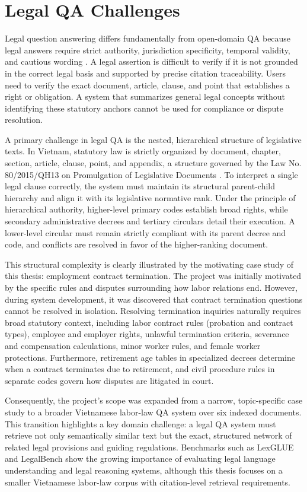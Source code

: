 \section{Legal QA Challenges}
Legal question answering differs fundamentally from open-domain QA because legal answers require strict authority, jurisdiction specificity, temporal validity, and cautious wording \cite{zhong2020legalqa}. A legal assertion is difficult to verify if it is not grounded in the correct legal basis and supported by precise citation traceability. Users need to verify the exact document, article, clause, and point that establishes a right or obligation. A system that summarizes general legal concepts without identifying these statutory anchors cannot be used for compliance or dispute resolution.

A primary challenge in legal QA is the nested, hierarchical structure of legislative texts. In Vietnam, statutory law is strictly organized by document, chapter, section, article, clause, point, and appendix, a structure governed by the Law No. 80/2015/QH13 on Promulgation of Legislative Documents \cite{vietnam2015law80}. To interpret a single legal clause correctly, the system must maintain its structural parent-child hierarchy and align it with its legislative normative rank. Under the principle of hierarchical authority, higher-level primary codes establish broad rights, while secondary administrative decrees and tertiary circulars detail their execution. A lower-level circular must remain strictly compliant with its parent decree and code, and conflicts are resolved in favor of the higher-ranking document.

This structural complexity is clearly illustrated by the motivating case study of this thesis: employment contract termination. The project was initially motivated by the specific rules and disputes surrounding how labor relations end. However, during system development, it was discovered that contract termination questions cannot be resolved in isolation. Resolving termination inquiries naturally requires broad statutory context, including labor contract rules (probation and contract types), employee and employer rights, unlawful termination criteria, severance and compensation calculations, minor worker rules, and female worker protections. Furthermore, retirement age tables in specialized decrees determine when a contract terminates due to retirement, and civil procedure rules in separate codes govern how disputes are litigated in court.

Consequently, the project's scope was expanded from a narrow, topic-specific case study to a broader Vietnamese labor-law QA system over six indexed documents. This transition highlights a key domain challenge: a legal QA system must retrieve not only semantically similar text but the exact, structured network of related legal provisions and guiding regulations. Benchmarks such as LexGLUE \cite{chalkidis2021lexglue} and LegalBench \cite{guha2023legalbench} show the growing importance of evaluating legal language understanding and legal reasoning systems, although this thesis focuses on a smaller Vietnamese labor-law corpus with citation-level retrieval requirements.

